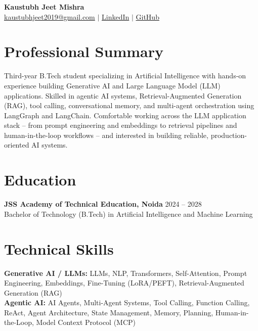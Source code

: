 \documentclass[10pt,letterpaper]{article}
\begin{document}
\begin{center}
    {\LARGE \textbf{Kaustubh Jeet Mishra}} \\[4pt]
    \href{mailto:kaustubhjeet2019@gmail.com}{kaustubhjeet2019@gmail.com}
    \quad $|$ \quad
    \href{https://www.linkedin.com/in/kaustubh-jeet-mishra-b83ba8345/}{LinkedIn}
    \quad $|$ \quad
    \href{https://github.com/KaustubhJM}{GitHub}
\end{center}

\section*{Professional Summary}

Third-year B.Tech student specializing in Artificial Intelligence with hands-on experience building Generative AI and Large Language Model (LLM) applications. Skilled in agentic AI systems, Retrieval-Augmented Generation (RAG), tool calling, conversational memory, and multi-agent orchestration using LangGraph and LangChain. Comfortable working across the LLM application stack -- from prompt engineering and embeddings to retrieval pipelines and human-in-the-loop workflows -- and interested in building reliable, production-oriented AI systems.

\section*{Education}

\textbf{JSS Academy of Technical Education, Noida} \hfill 2024 -- 2028\\
Bachelor of Technology (B.Tech) in Artificial Intelligence and Machine Learning

\section*{Technical Skills}


\textbf{Generative AI / LLMs:} LLMs, NLP, Transformers, Self-Attention, Prompt Engineering, Embeddings, Fine-Tuning (LoRA/PEFT), Retrieval-Augmented Generation (RAG) \\
\textbf{Agentic AI:} AI Agents, Multi-Agent Systems, Tool Calling, Function Calling, ReAct, Agent Architecture, State Management, Memory, Planning, Human-in-the-Loop, Model Context Protocol (MCP) \\
\end{document}
